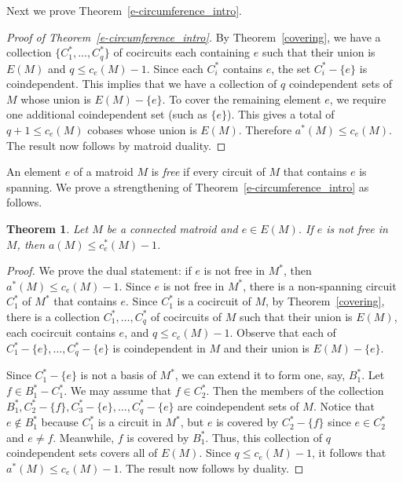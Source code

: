 \documentclass{amsart}
\newtheorem{theorem}{Theorem}[section]
\theoremstyle{definition}
\theoremstyle{remark}
\numberwithin{equation}{section}
\begin{document}
Next we prove Theorem~\ref{e-circumference_intro}. 

\begin{proof}[Proof of Theorem~\ref{e-circumference_intro}]
 By Theorem~\ref{covering}, we have a collection $\{C_1^*, \ldots, C_{q}^*\}$ of cocircuits each containing $e$ such that their union is $E(M)$ and $q\leq c_e(M)-1$. Since each $C_i^*$ contains $e$, the set $C_i^* - \{e\}$ is coindependent. This implies that we have a collection of $q$ coindependent sets of $M$ whose union is $E(M) - \{e\}$. To cover the remaining element $e$, we require one additional coindependent set (such as $\{e\}$). This gives a total of $q+1\leq c_e(M)$ cobases whose union is $E(M)$. Therefore $a^*(M) \leq c_e(M)$. The result now follows by matroid duality. 
\end{proof}

An element $e$ of a matroid $M$ is \textit{free} if every circuit of $M$ that contains $e$ is spanning. We prove a strengthening of Theorem~\ref{e-circumference_intro} as follows.  

\begin{theorem}
\label{cospan}
Let $M$ be a connected matroid and $e \in E(M)$. If $e$ is not free in $M$, then $a(M) \leq c^*_e(M)-1$.
\end{theorem}

\begin{proof}
We prove the dual statement: if $e$ is not free in $M^*$, then $a^*(M) \leq c_e(M) - 1$. Since $e$ is not free in $M^*$, there is a non-spanning circuit $C^*_1$ of $M^*$ that contains $e$. Since $C_1^*$ is a cocircuit of $M$, by Theorem~\ref{covering}, there is a collection $C_1^*, \ldots, C_{q}^*$ of cocircuits of $M$ such that their union is $E(M)$, each cocircuit contains $e$, and $q \leq c_e(M)-1$. Observe that each of $C_1^* - \{e\}, \ldots, C_{q}^* - \{e\}$ is coindependent in $M$ and their union is $E(M) - \{e\}$. 

Since $C_1^* - \{e\}$ is not a basis of $M^*$, we can extend it to form one, say, $B_1^*$. Let $f \in B_1^* - C_1^*$. We may assume that $f \in C_2^*$. Then the members of the collection $B_1^*, C_2^* - \{f\}, C_3^* - \{e\}, \ldots, C_{q}^* - \{e\}$ are coindependent sets of $M$. Notice that $e \notin B_1^*$ because $C_1^*$ is a circuit in $M^*$, but $e$ is covered by $C_2^* - \{f\}$ since $e \in C_2^*$ and $e \neq f$. Meanwhile, $f$ is covered by $B_1^*$. Thus, this collection of $q$ coindependent sets covers all of $E(M)$. Since $q \leq c_e(M)-1$, it follows that $a^*(M) \leq c_e(M)-1$. The result now follows by duality. 
\end{proof}
\end{document}

